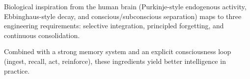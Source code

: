 \documentclass{article}
\begin{document}
Biological inspiration from the human brain
(Purkinje-style endogenous activity, Ebbinghaus-style decay, and conscious/subconscious separation)
maps to three engineering requirements: selective integration, principled forgetting, and continuous consolidation.

Combined with a strong memory system and an explicit consciousness loop (ingest, recall, act, reinforce), these ingredients yield better intelligence in practice.


\nocite{
  zhong2023memorybank,
  behrouz2025titans,
  behrouz2025allconnected,
  fountas2024emllm,
  jimenez2024hipporag,
  edge2024graphrag,
  wu2025survey,
  lewandowsky2015ebbinghaus,
  clewett2024predictions,
  kim2024predictionerror
}

\end{document}
